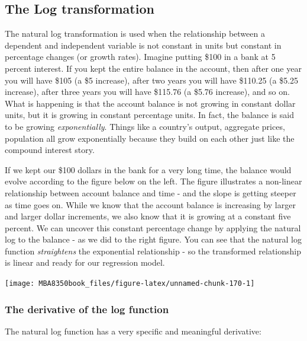 \documentclass[
]{book}
\begin{document}
\hypertarget{the-log-transformation}{%
\subsection{The Log transformation}\label{the-log-transformation}}

The natural log transformation is used when the relationship between a dependent and independent variable is not constant in units but constant in percentage changes (or growth rates). Imagine putting \$100 in a bank at 5 percent interest. If you kept the entire balance in the account, then after one year you will have \$105 (a \$5 increase), after two years you will have \$110.25 (a \$5.25 increase), after three years you will have \$115.76 (a \$5.76 increase), and so on. What is happening is that the account balance is not growing in constant dollar units, but it is growing in constant percentage units. In fact, the balance is said to be growing \emph{exponentially}. Things like a country's output, aggregate prices, population all grow exponentially because they build on each other just like the compound interest story.

If we kept our \$100 dollars in the bank for a very long time, the balance would evolve according to the figure below on the left. The figure illustrates a non-linear relationship between account balance and time - and the slope is getting steeper as time goes on. While we know that the account balance is increasing by larger and larger dollar increments, we also know that it is growing at a constant five percent. We can uncover this constant percentage change by applying the natural log to the balance - as we did to the right figure. You can see that the natural log function \emph{straightens} the exponential relationship - so the transformed relationship is linear and ready for our regression model.

\begin{center}\texttt{[image: MBA8350book\_files/figure-latex/unnamed-chunk-170-1]} \end{center}

\hypertarget{the-derivative-of-the-log-function}{%
\subsubsection*{The derivative of the log function}\label{the-derivative-of-the-log-function}}

The natural log function has a very specific and meaningful derivative:
\end{document}
